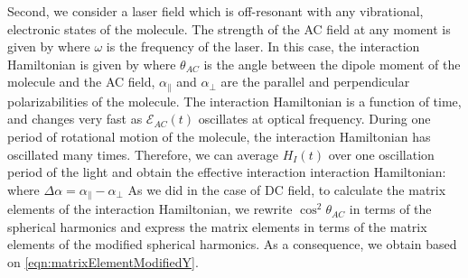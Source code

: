 Second, we consider a  laser field which is off-resonant with any vibrational, electronic states 
of the molecule. The strength of the AC field at any moment is given by 
where $\omega$ is the frequency of the laser. In this case, the interaction Hamiltonian is given by \cite{friedrich-95}
where $\theta_{AC}$ is the angle between the dipole moment of the molecule and the AC field, $\alpha_\|$ and
$\alpha_{\perp}$ are the parallel and perpendicular polarizabilities of the molecule. 
The interaction Hamiltonian is a function of time, and changes very fast as $\mathcal{E}_{ AC} (t)$ oscillates at optical 
frequency.
During one period of rotational motion of the molecule, the interaction Hamiltonian has oscillated many times. 
Therefore, we can average $H_{I}(t)$ over one oscillation period of the light and obtain the effective interaction
interaction Hamiltonian:
where $\Delta \alpha = \alpha_{\parallel} - \alpha_{\perp}$
As we did in the case of DC field, to calculate the matrix elements of the interaction Hamiltonian, we rewrite 
$\cos^2\theta_{AC}$ in terms of the spherical harmonics  and express the matrix elements in terms of the matrix 
elements of the modified spherical harmonics. As a consequence, we obtain
based on  \autoref{eqn:matrixElementModifiedY}. 

